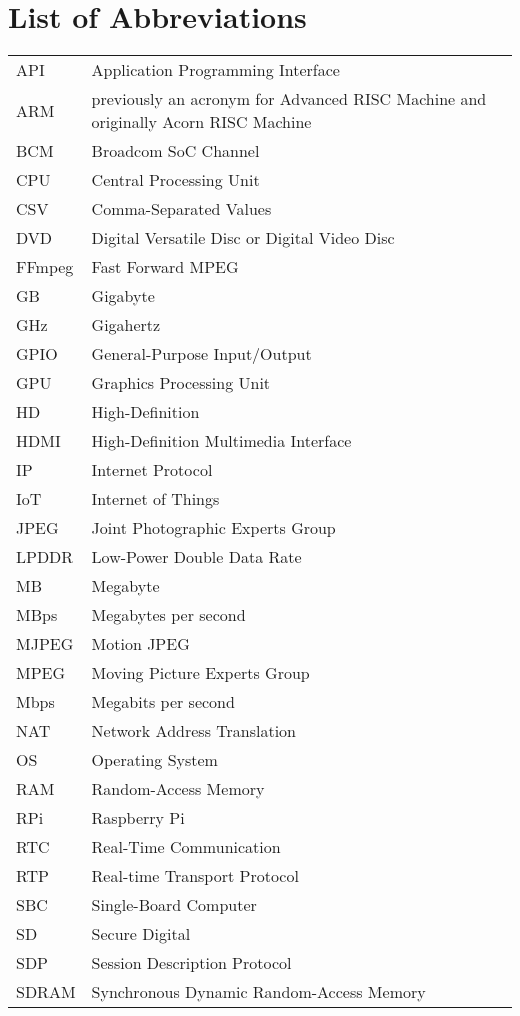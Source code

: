 \section*{List of Abbreviations}
\begin{table}[ht]
\begin{tabular}{lll}
API & Application Programming Interface \\
ARM & previously an acronym for Advanced RISC Machine and originally Acorn RISC Machine \\
BCM & Broadcom SoC Channel \\
CPU & Central Processing Unit \\
CSV & Comma-Separated Values \\
DVD & Digital Versatile Disc or Digital Video Disc \\
FFmpeg & Fast Forward MPEG \\
GB & Gigabyte \\
GHz & Gigahertz \\
GPIO & General-Purpose Input/Output \\
GPU & Graphics Processing Unit \\
HD & High-Definition \\
HDMI & High-Definition Multimedia Interface \\
IP & Internet Protocol \\
IoT & Internet of Things \\
JPEG & Joint Photographic Experts Group \\
LPDDR & Low-Power Double Data Rate \\
MB & Megabyte \\
MBps & Megabytes per second \\
MJPEG & Motion JPEG \\
MPEG & Moving Picture Experts Group \\
Mbps & Megabits per second \\
NAT & Network Address Translation \\
OS & Operating System \\
RAM & Random-Access Memory \\
RPi & Raspberry Pi \\
RTC & Real-Time Communication \\
RTP & Real-time Transport Protocol \\
SBC & Single-Board Computer \\
SD & Secure Digital \\
SDP & Session Description Protocol \\
SDRAM & Synchronous Dynamic Random-Access Memory \\

\end{tabular}
\end{table}
